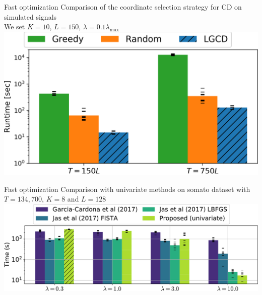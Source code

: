 \documentclass{beamer}
\begin{document}



\appendix


\begin{frame}{Fast optimization}
    Comparison of the coordinate selection strategy for CD on simulated signals\\
    We set $K=10$, $L=150$, $\lambda = 0.1 \lambda_{\max}$\\[1em]
    \centering
    \includegraphics[width=.9\textwidth]{CD_strategies_comparison.png}
\end{frame}

\begin{frame}{Fast optimization}
Comparison with univariate methods on somato dataset with $T=134,700$, $K=8$ and $L=128$\\[1em]
\includegraphics[width=\textwidth]{all_last_0001_T_13470_P1_K8_L128}
\end{frame}
\end{document}
